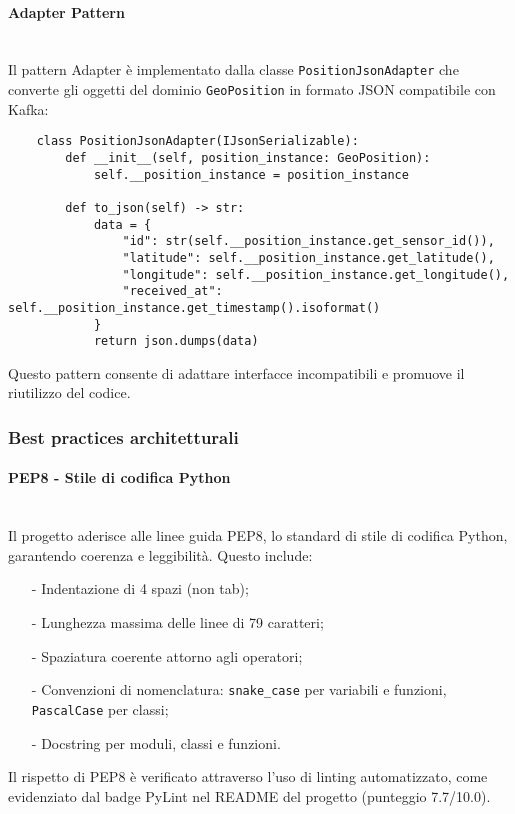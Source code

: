 \documentclass[10pt]{article}
\newcommand{\myparagraph}[1]{\paragraph{#1}\mbox{}\\}
\begin{document}
\myparagraph{Adapter Pattern}
    Il pattern Adapter è implementato dalla classe \texttt{PositionJsonAdapter} che converte gli oggetti del dominio \texttt{GeoPosition} in formato JSON compatibile con Kafka:
    \begin{lstlisting}
    class PositionJsonAdapter(IJsonSerializable):
        def __init__(self, position_instance: GeoPosition):
            self.__position_instance = position_instance
            
        def to_json(self) -> str:
            data = {
                "id": str(self.__position_instance.get_sensor_id()),
                "latitude": self.__position_instance.get_latitude(),
                "longitude": self.__position_instance.get_longitude(),
                "received_at": self.__position_instance.get_timestamp().isoformat()
            }
            return json.dumps(data)
    \end{lstlisting}
    Questo pattern consente di adattare interfacce incompatibili e promuove il riutilizzo del codice.



    \subsubsection{Best practices architetturali}
    \myparagraph{PEP8 - Stile di codifica Python}
    Il progetto aderisce alle linee guida PEP8, lo standard di stile di codifica Python, garantendo coerenza e leggibilità. Questo include:
    \begin{itemize}
        \item[-] Indentazione di 4 spazi (non tab);
        \item[-] Lunghezza massima delle linee di 79 caratteri;
        \item[-] Spaziatura coerente attorno agli operatori;
        \item[-] Convenzioni di nomenclatura: \texttt{snake\_case} per variabili e funzioni, \texttt{PascalCase} per classi;
        \item[-] Docstring per moduli, classi e funzioni.
    \end{itemize}
    Il rispetto di PEP8 è verificato attraverso l'uso di linting automatizzato, come evidenziato dal badge PyLint nel README del progetto (punteggio 7.7/10.0).
    
\end{document}
